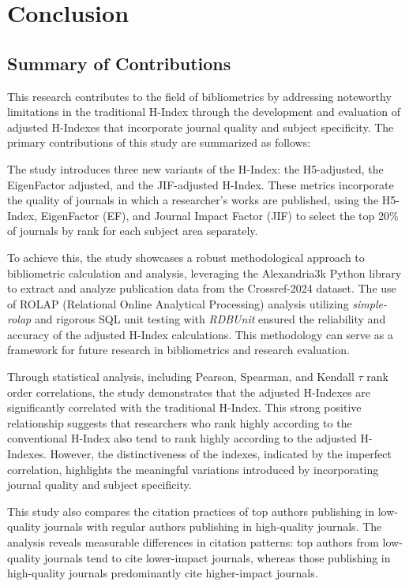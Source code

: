 \chapter{Conclusion}
\label{ch:conclusion}

\section{Summary of Contributions}

This research contributes to the field of bibliometrics by addressing
noteworthy limitations in the traditional H-Index through the development and
evaluation of adjusted H-Indexes that incorporate journal quality and subject
specificity. The primary contributions of this study are summarized as follows:

The study introduces three new variants of the H-Index: the H5-adjusted, the
EigenFactor adjusted, and the JIF-adjusted H-Index. These metrics incorporate
the quality of journals in which a researcher’s works are published, using the
H5-Index, EigenFactor (EF), and Journal Impact Factor (JIF) to select the top
20\% of journals by rank for each subject area separately.

To achieve this, the study showcases a robust methodological approach to
bibliometric calculation and analysis, leveraging the Alexandria3k Python
library to extract and analyze publication data from the Crossref-2024 dataset.
The use of ROLAP (Relational Online Analytical Processing) analysis utilizing
\emph{simple-rolap} and rigorous SQL unit testing with \emph{RDBUnit} ensured
the reliability and accuracy of the adjusted H-Index calculations. This
methodology can serve as a framework for future research in bibliometrics and
research evaluation.

Through statistical analysis, including Pearson, Spearman, and Kendall $\tau$
rank order correlations, the study demonstrates that the adjusted H-Indexes are
significantly correlated with the traditional H-Index. This strong positive
relationship suggests that researchers who rank highly according to the
conventional H-Index also tend to rank highly according to the adjusted
H-Indexes. However, the distinctiveness of the indexes, indicated by the
imperfect correlation, highlights the meaningful variations introduced by
incorporating journal quality and subject specificity.

This study also compares the citation practices of top authors publishing in
low-quality journals with regular authors publishing in high-quality journals.
The analysis reveals measurable differences in citation patterns: top authors
from low-quality journals tend to cite lower-impact journals, whereas those
publishing in high-quality journals predominantly cite higher-impact journals.


